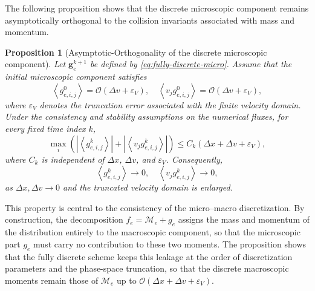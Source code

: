 \documentclass[pdflatex,final,10pt]{article}
\newtheorem{proposition}{Proposition}[section]
\newcommand{\Del}[1]{#1}
\begin{document}
\Del{The following proposition shows that the discrete microscopic component
remains asymptotically orthogonal to the collision invariants associated
with mass and momentum.}

\begin{proposition}[\Del{Asymptotic-Orthogonality of the discrete microscopic component}]
\label{prop_ge_fulldis}
\Del{Let $\boldsymbol{g}_e^{k+1}$ be defined by
\eqref{eq:fully-discrete-micro}. Assume that the initial microscopic
component satisfies
\begin{equation*}
    \left\langle g_{e,i,j}^{0}\right\rangle
    =
    \mathcal{O}(\Delta v+\varepsilon_V),
    \quad
    \left\langle v_jg_{e,i,j}^{0}\right\rangle
    =
    \mathcal{O}(\Delta v+\varepsilon_V),
\end{equation*}
where $\varepsilon_V$ denotes the truncation error associated with the
finite velocity domain. Under the consistency and stability assumptions
on the numerical fluxes, for every fixed time index $k$,}
\begin{equation}
    \max_i
    \left(
        \left|
            \left\langle g_{e,i,j}^{k}\right\rangle
        \right|
        +
        \left|
            \left\langle v_jg_{e,i,j}^{k}\right\rangle
        \right|
    \right)
    \leq
    C_k\left(\Delta x+\Delta v+\varepsilon_V\right),
    \label{eq:discrete-moment-estimate}
\end{equation}
where $C_k$ is independent of $\Delta x$, $\Delta v$, and
$\varepsilon_V$. Consequently,
\begin{equation*}
    \left\langle g_{e,i,j}^{k}\right\rangle\longrightarrow0,
    \quad
    \left\langle v_jg_{e,i,j}^{k}\right\rangle\longrightarrow0,
\end{equation*}
as $\Delta x,\Delta v\to0$ and the truncated velocity domain is enlarged.
\end{proposition}

\Del{This property is central to the consistency of the micro--macro discretization. By construction, the decomposition $f_e = \mathcal{M}_e + g_e$ assigns the mass and momentum of the distribution entirely to the macroscopic component, so that the microscopic part $g_e$ must carry no contribution to these two moments. The
proposition shows that the fully discrete scheme keeps this leakage at the order of discretization parameters and the phase-space truncation, so that the discrete macroscopic moments remain those of $\mathcal{M}_e$ up to $\mathcal{O}(\Delta x + \Delta v +\varepsilon_V)$.}
\end{document}
